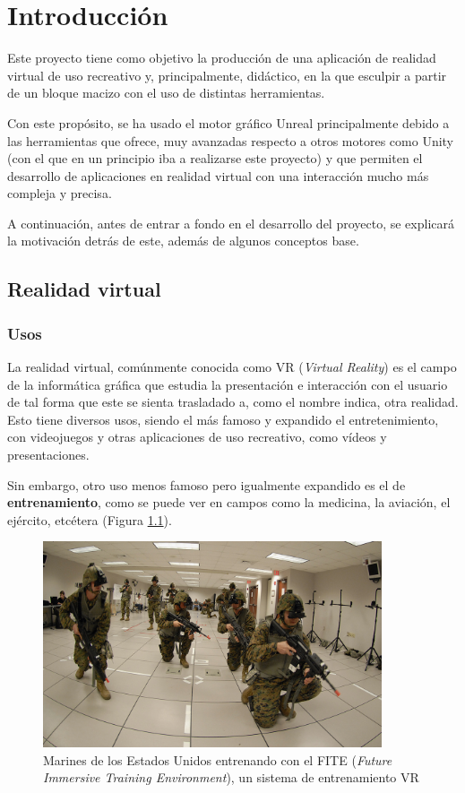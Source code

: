 \chapter{Introducción}
Este proyecto tiene como objetivo la producción de una aplicación de realidad virtual de uso recreativo y, principalmente, didáctico, en la que esculpir a partir de un bloque macizo con el uso de distintas herramientas.

Con este propósito, se ha usado el motor gráfico Unreal principalmente debido a las herramientas que ofrece, muy avanzadas respecto a otros motores como Unity (con el que en un principio iba a realizarse este proyecto) y que permiten el desarrollo de aplicaciones en realidad virtual con una interacción mucho más compleja y precisa.

A continuación, antes de entrar a fondo en el desarrollo del proyecto, se explicará la motivación detrás de este, además de algunos conceptos base.

\section{Realidad virtual}

\subsection{Usos}

La realidad virtual, comúnmente conocida como VR (\textit{Virtual Reality}) es el campo de la informática gráfica que estudia la presentación e interacción con el usuario de tal forma que este se sienta trasladado a, como el nombre indica, otra realidad. \cite{wohlgenannt2020virtual} Esto tiene diversos usos, siendo el más famoso y expandido el entretenimiento, con videojuegos y otras aplicaciones de uso recreativo, como vídeos y presentaciones.

Sin embargo, otro uso menos famoso pero igualmente expandido es el de \textbf{entrenamiento}, como se puede ver en campos como la medicina, la aviación, el ejército, etcétera \cite{vrtraining} (Figura \ref{fig:vr_military}).

\begin{figure}[H]
	\centering
	\includegraphics[width=10cm]{imagenes/vr_military}
	\caption{Marines de los Estados Unidos entrenando con el FITE (\textit{Future Immersive Training Environment}), un sistema de entrenamiento VR}
	\label{fig:vr_military}
\end{figure}

